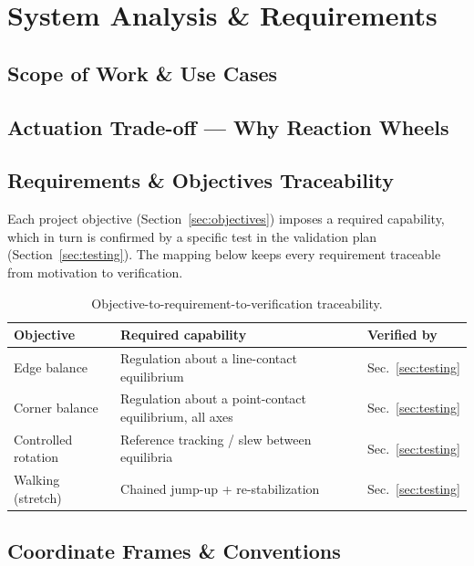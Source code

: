 \section{System Analysis \& Requirements}

\subsection{Scope of Work \& Use Cases}
\label{sec:scope}


\subsection{Actuation Trade-off --- Why Reaction Wheels}
\label{sec:tradeoff}


\subsection{Requirements \& Objectives Traceability}
\label{sec:requirements}

Each project objective (Section~\ref{sec:objectives}) imposes a required capability,
which in turn is confirmed by a specific test in the validation plan
(Section~\ref{sec:testing}). The mapping below keeps every requirement traceable
from motivation to verification.

\begin{table}[h]
\centering
\caption{Objective-to-requirement-to-verification traceability.}
\label{tab:traceability}
\begin{tabular}{lll}
\toprule
Objective & Required capability & Verified by \\
\midrule
Edge balance        & Regulation about a line-contact equilibrium & Sec.~\ref{sec:testing} \\
Corner balance      & Regulation about a point-contact equilibrium, all axes & Sec.~\ref{sec:testing} \\
Controlled rotation & Reference tracking / slew between equilibria & Sec.~\ref{sec:testing} \\
Walking (stretch)   & Chained jump-up + re-stabilization & Sec.~\ref{sec:testing} \\
\bottomrule
\end{tabular}
\end{table}

\subsection{Coordinate Frames \& Conventions}
\label{sec:frames}

